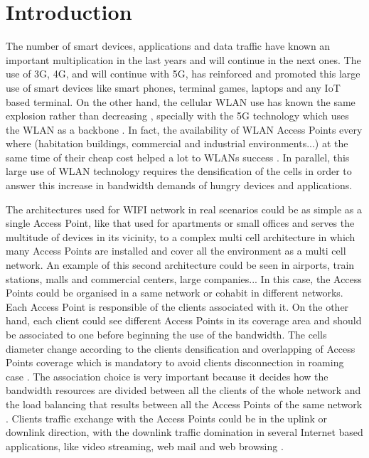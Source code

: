 \documentclass[journal,transmag]{IEEEtran}
\begin{document}
\IEEEdisplaynontitleabstractindextext

\IEEEpeerreviewmaketitle

\section{Introduction}

The number of smart devices, applications and data traffic have known an important multiplication in the last years and will continue in the next ones. The use of 3G, 4G, and will continue with 5G, has reinforced and promoted this large use of smart devices like smart phones, terminal games, laptops and any IoT based terminal. On the other hand, the cellular WLAN use has known the same explosion rather than decreasing \cite{17why_Long_WIFI_Connect,14group_based_RRM}, specially with the 5G technology which uses the WLAN as a backbone \cite{16AP_association_optimisation_fairness}. In fact, the availability of WLAN Access Points every where (habitation buildings, commercial and industrial environments...) at the same time of their cheap cost helped a lot to WLANs success \cite{15Node_throughput_enhencement_wifi}. In parallel, this large use of WLAN technology requires the densification of the cells in order to answer this increase in bandwidth demands of hungry devices and applications.     

The architectures used for WIFI network in real scenarios could be as simple as a single Access Point, like that used for apartments or small offices and serves the multitude of devices in its vicinity, to a complex multi cell architecture in which many Access Points are installed and cover all the environment as a multi cell network. An example of this second architecture could be seen in airports, train stations, malls and commercial centers, large companies... In this case, the Access Points could be organised in a same network or cohabit in different networks. Each Access Point is responsible of the clients associated with it. On the other hand, each client could see different Access Points in its coverage area and should be associated to one before beginning the use of the bandwidth. The cells diameter change according to the clients densification and overlapping of Access Points coverage which is mandatory to avoid clients disconnection in roaming case \cite{15fuzzy_load_balancing_802.11}. The association choice is very important because it decides how the bandwidth resources are divided between all the clients of the whole network and the load balancing that results between all the Access Points of the same network \cite{14AP_association_multirate_WLAN}. Clients traffic exchange with the Access Points could be in the uplink or downlink direction, with the downlink traffic domination in several Internet based applications, like video streaming, web mail and web browsing \cite{05DIRAC}.   
\end{document}
